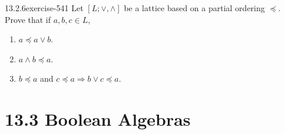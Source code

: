 \documentclass[twoside,10pt,]{book}
\numberwithin{equation}{section}
\begin{document}
\begin{divisionsolution}{13.2.6}{}{exercise-541}%
\hypertarget{p-4847}{}%
Let \([L; \lor  , \land ]\) be a lattice based on a partial ordering \(\preceq\).   Prove that if \(a, b, c \in L\),\leavevmode%
\begin{enumerate}[label=(\alph*)]
\item\hypertarget{li-2211}{}\hypertarget{p-4848}{}%
\(a \preceq a \lor  b \).%
\item\hypertarget{li-2212}{}\hypertarget{p-4849}{}%
\(a \land  b \preceq  a\).%
\item\hypertarget{li-2213}{}\hypertarget{p-4850}{}%
\(b \preceq  a\) and \(c \preceq  a \Rightarrow   b \lor  c \preceq a\).%
\end{enumerate}
%
\end{divisionsolution}%
\section*{13.3 Boolean Algebras}
\end{document}
